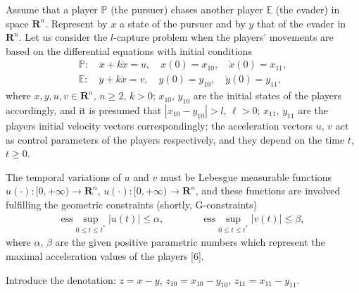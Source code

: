 \documentclass[12pt]{llncs}
\begin{document}
Assume that a player $\mathbb P$ (the pursuer) chases another player $\mathbb E$ (the evader) in space $\mathbf R^n$. Represent by $x$ a state of the pursuer and by $y$ that of the evader in $\mathbf R^n$. Let us consider the $l$-capture problem when the players' movements are based on the differential equations with initial conditions
\begin{gather*}
\mathbb{P}:\quad \ddot{x}+k\dot{x}=u,\quad x(0)=x_{10},\quad \dot{x}(0)=x_{11}, \\
\mathbb{E}:\quad \ddot{y}+k\dot{x}=v,\quad y(0)=y_{10},\quad \dot{y}(0)=y_{11},
\end{gather*}
where $x, y, u, v \in \mathbf{R}^n$, $n\geq2$, $k>0$; $x_{10}$, $y_{10}$ are the initial states of the players accordingly, and it is presumed that $|x_{10}-y_{10}|>l$, $\ell>0$; $x_{11}$, $y_{11}$ are the players initial velocity vectors correspondingly; the acceleration vectors $u$, $v$ act as control parameters of the players respectively, and they depend on the time $t$, $t\geq0$.

The temporal variations of $u$ and $v$ must be Lebesgue measurable functions $u(\cdot):[0,+\infty)\rightarrow\mathbf R^n$, $u(\cdot):[0,+\infty)\rightarrow\mathbf R^n$, and these functions are involved fulfilling the geometric constraints (shortly, G-constraints)\
\begin{gather*}
\mbox{ess}\sup_{0\leq t\leq t^*}|u(t)|\leq \alpha, \quad \quad \quad \quad
\mbox{ess}\sup_{0\leq t\leq t^*}|v(t)|\leq \beta,
\end{gather*}
where $\alpha$, $\beta$ are the given positive parametric numbers which represent the maximal acceleration values of the players [6].

Introduce the denotation: $z=x-y$, $z_{10}=x_{10}-y_{10}$, $z_{11}=x_{11}-y_{11}$.
\end{document}
